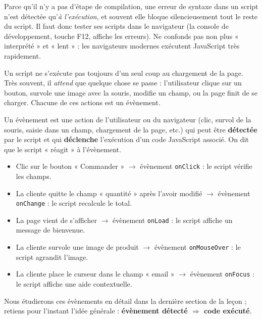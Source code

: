 \documentclass[11pt]{article}
\newcommand{\cle}[1]{{\popxbold\color{popdark}#1}}
\newcounter{popsec}
\newcounter{popsub}
\newcommand{\courssub}[1]{%
  \stepcounter{popsub}%
  \par\vspace{9pt}\noindent{\popxbold\fontsize{11.5}{13}\selectfont\color{popink}{\color{poporange}\thepopsec.\thepopsub}\hspace{6pt}#1}\par\nopagebreak\vspace{4pt}
}
\begin{document}
\begin{attention}
Parce qu'il n'y a pas d'étape de compilation, une erreur de syntaxe dans un script n'est détectée qu'\emph{à l'exécution}, et souvent elle bloque silencieusement tout le reste du script. Il faut donc tester ses scripts dans le navigateur (la console de développement, touche F12, affiche les erreurs). Ne confonds pas non plus « interprété » et « lent » : les navigateurs modernes exécutent JavaScript très rapidement.
\end{attention}

\courssub{Notion d'évènement}

Un script ne s'exécute pas toujours d'un seul coup au chargement de la page. Très souvent, il \emph{attend} que quelque chose se passe : l'utilisateur clique sur un bouton, survole une image avec la souris, modifie un champ, ou la page finit de se charger. Chacune de ces actions est un \cle{évènement}.

\begin{definition}[Évènement]
Un \cle{évènement} est une action de l'utilisateur ou du navigateur (clic, survol de la souris, saisie dans un champ, chargement de la page, etc.) qui peut être \textbf{détectée} par le script et qui \textbf{déclenche} l'exécution d'un code JavaScript associé. On dit que le script « réagit » à l'évènement.
\end{definition}

\begin{exemplebox}
\begin{itemize}
\item Clic sur le bouton « Commander » $\rightarrow$ évènement \texttt{onClick} : le script vérifie les champs.
\item La cliente quitte le champ « quantité » après l'avoir modifié $\rightarrow$ évènement \texttt{onChange} : le script recalcule le total.
\item La page vient de s'afficher $\rightarrow$ évènement \texttt{onLoad} : le script affiche un message de bienvenue.
\item La cliente survole une image de produit $\rightarrow$ évènement \texttt{onMouseOver} : le script agrandit l'image.
\item La cliente place le curseur dans le champ « email » $\rightarrow$ évènement \texttt{onFocus} : le script affiche une aide contextuelle.
\end{itemize}
Nous étudierons ces évènements en détail dans la dernière section de la leçon ; retiens pour l'instant l'idée générale : \textbf{évènement détecté $\Rightarrow$ code exécuté}.
\end{exemplebox}
\end{document}
